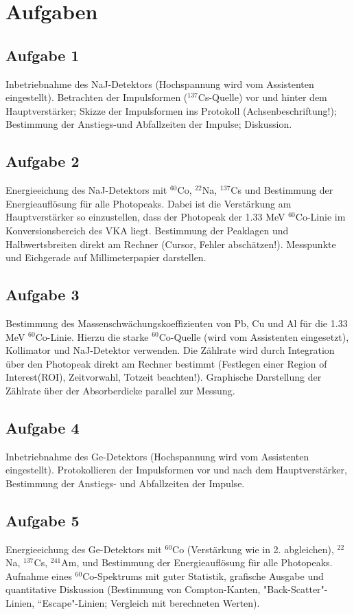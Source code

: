 \section{Aufgaben}
\subsection{Aufgabe 1}
Inbetriebnahme des NaJ-Detektors (Hochspannung wird vom Assistenten eingestellt). Betrachten der Impulsformen ($^{137}$Cs-Quelle) vor und hinter dem Hauptverstärker; Skizze der Impulsformen ins Protokoll (Achsenbeschriftung!); Bestimmung der Anstiegs-und Abfallzeiten der Impulse; Diskussion.

\subsection{Aufgabe 2}
Energieeichung des NaJ-Detektors mit $^{60}$Co, $^{22}$Na, $^{137}$Cs und Bestimmung der Energieauflösung für alle Photopeaks. Dabei ist die Verstärkung am Hauptverstärker so einzustellen, dass der Photopeak der 1.33 MeV $^{60}$Co-Linie im Konversionsbereich des VKA liegt. Bestimmung der Peaklagen und Halbwertsbreiten direkt am Rechner (Cursor, Fehler 
abschätzen!). Messpunkte und Eichgerade auf Millimeterpapier darstellen. 

\subsection{Aufgabe 3}
Bestimmung des Massenschwächungskoeffizienten von Pb, Cu und Al für die 1.33 MeV $^{60}$Co-Linie. Hierzu die starke $^{60}$Co-Quelle (wird vom Assistenten eingesetzt), Kollimator und NaJ-Detektor verwenden. Die Zählrate wird durch Integration über den Photopeak direkt am Rechner bestimmt (Festlegen einer Region of Interest(ROI), Zeitvorwahl, Totzeit 
beachten!). Graphische Darstellung der Zählrate über der Absorberdicke parallel zur Messung. 

\subsection{Aufgabe 4}
Inbetriebnahme des Ge-Detektors (Hochspannung wird vom Assistenten eingestellt). Protokollieren der Impulsformen vor und nach dem Hauptverstärker, Bestimmung der Anstiegs- und Abfallzeiten der Impulse.

\subsection{Aufgabe 5}
Energieeichung des Ge-Detektors mit $^{60}$Co (Verstärkung wie in 2. abgleichen), $^{22}$Na, $^{137}$Cs, $^{241}$Am, und Bestimmung der Energieauflösung für alle Photopeaks. Aufnahme eines $^{60}$Co-Spektrums mit guter Statistik, grafische Ausgabe und quantitative Diskussion 
(Bestimmung von Compton-Kanten, "Back-Scatter"-Linien, “Escape"-Linien; Vergleich mit berechneten Werten). 

